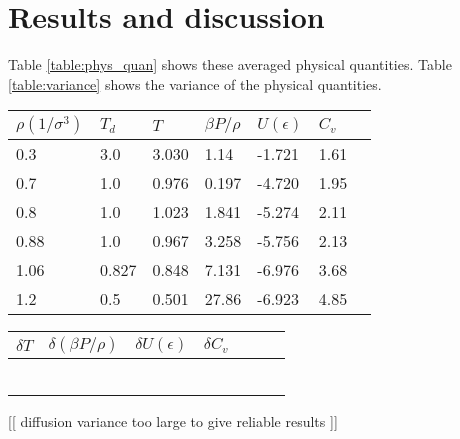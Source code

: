 \section{Results and discussion}



Table \ref{table:phys_quan} shows these averaged physical quantities. Table \ref{table:variance} shows the variance of the physical quantities.
\begin{center}
\begin{tabular}{lllllll}
\hline \hline
$\rho(1/\sigma^3)$ & $T_d$ & $T$ & $\beta P/\rho$ & $U(\epsilon)$ & $C_v$ \\
\hline
0.3 & 3.0 & 3.030 & 1.14 & -1.721 & 1.61 \\
0.7 & 1.0 & 0.976 & 0.197 & -4.720 & 1.95 \\
0.8 & 1.0 & 1.023 & 1.841 & -5.274 & 2.11 \\
0.88& 1.0 & 0.967 & 3.258 & -5.756 & 2.13 \\
1.06& 0.827&0.848 & 7.131 & -6.976 & 3.68 \\
1.2 & 0.5 & 0.501 & 27.86 & -6.923 & 4.85 \\
\hline \hline
\end{tabular}
\vspace{-0.1cm}
\label{table:phys_quan}
\end{center}

\begin{center}
\begin{tabular}{lllllll}
\hline \hline
 $\delta T$ & $\delta (\beta P/\rho)$ & $\delta U(\epsilon)$ & $\delta C_v$ \\
\hline
  &  &  &  \\
  &  &  &  \\
  &  &  &  \\
  &  &  &  \\
  &  &  &  \\
  &  &  &  \\
\hline \hline
\end{tabular}
\vspace{-0.1cm}
\label{table:variance}
\end{center}

[[ diffusion variance too large to give reliable results ]]